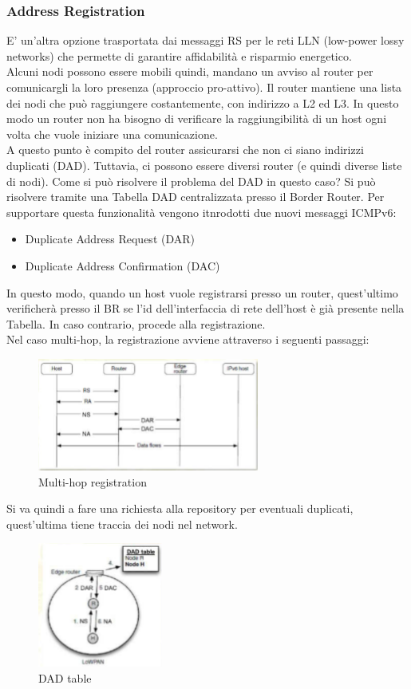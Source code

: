 \documentclass{article}
\begin{document}
\subsubsection{Address Registration}
E' un'altra opzione trasportata dai messaggi RS per le reti LLN (low-power lossy networks) che permette di garantire affidabilità e risparmio energetico.\\
Alcuni nodi possono essere mobili quindi, mandano un avviso al router per comunicargli la loro presenza (approccio pro-attivo). Il router mantiene una lista dei nodi che può raggiungere costantemente, con indirizzo a L2 ed L3. In questo modo un router non ha bisogno di verificare la raggiungibilità di un host ogni volta che vuole iniziare una comunicazione. \\
A questo punto è compito del router assicurarsi che non ci siano indirizzi duplicati (DAD). Tuttavia, ci possono essere diversi router (e quindi diverse liste di nodi). Come si può risolvere il problema del DAD in questo caso? Si può risolvere tramite una Tabella DAD centralizzata presso il Border Router. Per supportare questa funzionalità vengono itnrodotti due nuovi messaggi ICMPv6:
\begin{itemize}
    \item Duplicate Address Request (DAR)
    \item Duplicate Address Confirmation (DAC)
\end{itemize}
In questo modo, quando un host vuole registrarsi presso un router, quest'ultimo verificherà presso il BR se l'id dell'interfaccia di rete dell'host è già presente nella Tabella. In caso contrario, procede alla registrazione. \\ 
Nel caso multi-hop, la registrazione avviene attraverso i seguenti passaggi:
\begin{figure}[H]
\centering
\includegraphics[scale=0.7]{figures/multihop registration.PNG}
\caption{Multi-hop registration}
\end{figure}
Si va quindi a fare una richiesta alla repository per eventuali duplicati, quest'ultima tiene traccia dei nodi nel network. 
\begin{figure}[H]
\centering
\includegraphics[scale=0.7]{figures/dad table.PNG}
\caption{DAD table}
\end{figure}
\end{document}
